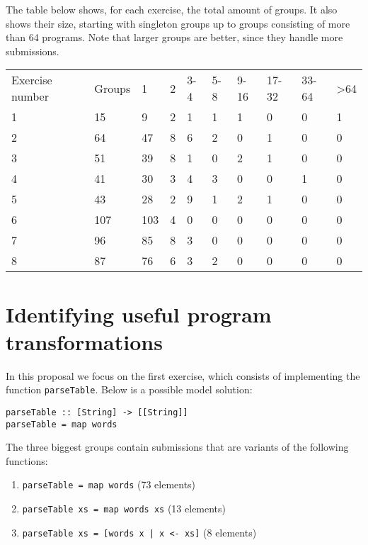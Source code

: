 The table below shows, for each exercise, the total amount of groups. It also shows their size, starting with singleton groups up to groups consisting of more than 64 programs. Note that larger groups are better, since they handle more submissions.

\begin{tabular}{l l l l l l l l l l}
    Exercise number & Groups & 1     & 2   & 3-4 & 5-8 & 9-16 & 17-32 & 33-64 & >64 \\
    1               & 15     &  9    &  2  &  1  &  1  &  1  &  0  &  0  &  1       \\
    2               & 64     &  47   &  8  &  6  &  2  &  0  &  1  &  0  &  0       \\
    3               & 51     &  39   &  8  &  1  &  0  &  2  &  1  &  0  &  0       \\
    4               & 41     &  30   &  3  &  4  &  3  &  0  &  0  &  1  &  0       \\
    5               & 43     &  28   &  2  &  9  &  1  &  2  &  1  &  0  &  0       \\
    6               & 107    &  103  &  4  &  0  &  0  &  0  &  0  &  0  &  0       \\
    7               & 96     &  85   &  8  &  3  &  0  &  0  &  0  &  0  &  0       \\
    8               & 87     &  76   &  6  &  3  &  2  &  0  &  0  &  0  &  0
\end{tabular}

\section{Identifying useful program transformations}

In this proposal we focus on the first exercise, which consists of implementing the function \texttt{parseTable}. Below is a possible model solution:

\begin{verbatim}
parseTable :: [String] -> [[String]]
parseTable = map words
\end{verbatim}

The three biggest groups contain submissions that are variants of the following functions:

\begin{enumerate}
\item \texttt{parseTable = map words} (73 elements)
\item \texttt{parseTable xs = map words xs} (13 elements)
\item \texttt{parseTable xs = [words x | x <- xs]} (8 elements)
\end{enumerate}

